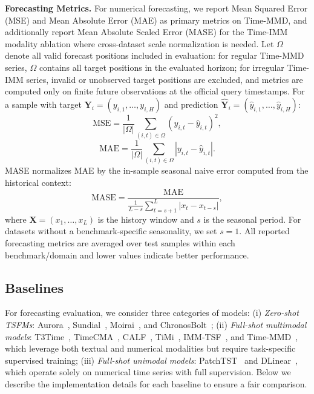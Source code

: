\documentclass[11pt]{article}
\newcommand{\minisection}[1]{\vspace{5pt}\noindent\textbf{#1.}}
\begin{document}
\minisection{Forecasting Metrics}
For numerical forecasting, we report Mean Squared Error (MSE) and Mean Absolute Error (MAE) as primary metrics on Time-MMD, and additionally report Mean Absolute Scaled Error (MASE) for the Time-IMM modality ablation where cross-dataset scale normalization is needed.
Let $\Omega$ denote all valid forecast positions included in evaluation: for regular Time-MMD series, $\Omega$ contains all target positions in the evaluated horizon; for irregular Time-IMM series, invalid or unobserved target positions are excluded, and metrics are computed only on finite future observations at the official query timestamps.
For a sample with target $\mathbf{Y}_i=(y_{i,1},\ldots,y_{i,H})$ and prediction $\hat{\mathbf{Y}}_i=(\hat{y}_{i,1},\ldots,\hat{y}_{i,H})$:
\begin{equation}
    \mathrm{MSE}
    =
    \frac{1}{|\Omega|}
    \sum_{(i,t)\in\Omega}
    \left(y_{i,t}-\hat{y}_{i,t}\right)^2,
\end{equation}
\begin{equation}
    \mathrm{MAE}
    =
    \frac{1}{|\Omega|}
    \sum_{(i,t)\in\Omega}
    \left|y_{i,t}-\hat{y}_{i,t}\right|.
\end{equation}
MASE normalizes MAE by the in-sample seasonal naive error computed from the historical context:
\begin{equation}
    \mathrm{MASE}
    =
    \frac{\mathrm{MAE}}{
    \frac{1}{L-s}
    \sum_{t=s+1}^{L}
    \left|x_t-x_{t-s}\right|
    },
\end{equation}
where $\mathbf{X}=(x_1,\ldots,x_L)$ is the history window and $s$ is the seasonal period.
For datasets without a benchmark-specific seasonality, we set $s=1$.
All reported forecasting metrics are averaged over test samples within each benchmark/domain and lower values indicate better performance.

\subsection{Baselines}
\label{app:baselines}

For forecasting evaluation, we consider three categories of models:
(i) \textit{Zero-shot TSFMs}: Aurora~\citep{wu2025aurora}, Sundial~\citep{liu2025sundial}, Moirai~\citep{woo2024unified}, and ChronosBolt~\citep{ansarichronos};
(ii) \textit{Full-shot multimodal models}: T3Time~\citep{chowdhury2026t3time}, TimeCMA~\citep{liu2025timecma}, CALF~\citep{liu2025calf}, TiMi~\citep{lin2026timi}, IMM-TSF~\citep{chang2026time}, and Time-MMD~\citep{liu2024time}, which leverage both textual and numerical modalities but require task-specific supervised training;
(iii) \textit{Full-shot unimodal models}: PatchTST~\citep{nie2023time} and DLinear~\citep{zeng2023transformers}, which operate solely on numerical time series with full supervision.
Below we describe the implementation details for each baseline to ensure a fair comparison.
\end{document}
